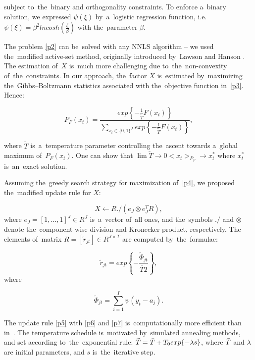 subject to~the~binary and orthogonality constraints. To enforce a~binary solution, we expressed $\psi(\xi)$ by~a~logistic regression function, i.e. $\psi(\xi)=\beta^2lncosh\left(\frac{\xi}{\beta}\right)$ with the~parameter $\beta$.

The problem \ref{p2} can be~solved with any NNLS algorithm – we used the~modified active-set method, originally introduced by~Lawson and Hanson \cite{lawson1995solving}. The estimation of~$X$ is~much more challenging due to~the~non-convexity of~the~constraints. In our approach, the~factor $X$ is~estimated by~maximizing the~Gibbs–Boltzmann statistics \cite{treumann2014beyond} associated with the~objective function in~\ref{p3}. Hence:

\begin{equation}\label{p4}
  P_F(x_t)=\frac{exp\left\{ -\frac{1}{\widetilde{T}}F(x_t) \right\}}{\sum_{x_t\in\{0,1\}^J}exp\left\{ -\frac{1}{\widetilde{T}}F(x_t)\right\}},
\end{equation}

where $\widetilde{T}$ is~a~temperature parameter controlling the~ascent towards a~global maximum of~$P_F(x_t)$. One can show that $\lim\widetilde{T}\rightarrow 0<x_t>_{P_F}\rightarrow x_t^*$ where $x_t^*$ is~an~exact solution.

Assuming the~greedy search strategy for maximization of~\ref{p4}, we proposed the~modified update rule for $X$: 

\begin{equation}\label{p5}
  X\leftarrow R./\left( e_J\otimes e_J^TR\right),
\end{equation}
where $e_J=[1,\dots,1]^J\in R^J$ is~a~vector of~all ones, and the~symbols $./$ and $\otimes$ denote the~component-wise division and Kronecker product, respectively. The elements of~matrix $R=[\widetilde{r}_{jt}]\in R^{J\times T}$ are computed by~the~formulae: 

\begin{equation}\label{p6}
  \widetilde{r}_{jt}=exp\left\{-\frac{\widetilde{\Phi}_{jt}}{\widetilde{T2}} \right\},
\end{equation}
 where 

\begin{equation}\label{p7}
  \widetilde{\Phi}_{jt}=\sum_{i=1}^I\psi(y_t-a_j).
\end{equation}

 The update rule \ref{p5} with \ref{p6} and \ref{p7} is~computationally more efficient than in~\cite{zdunek2008data}. The temperature schedule is~motivated by~simulated annealing methods, and set according to~the~exponential rule: $\widetilde{T}=\Bar{T}+T_0exp\{-\lambda s\}$, where $\Bar{T}$ and $\lambda$ are initial parameters, and $s$ is~the~iterative step.

